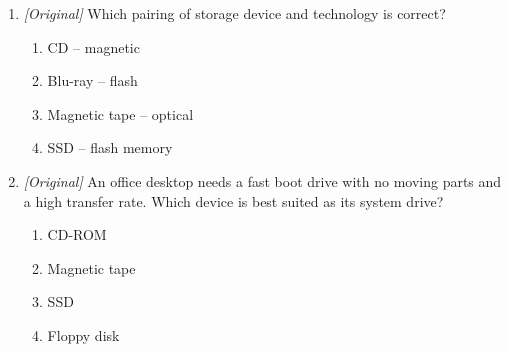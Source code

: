 \documentclass[11pt]{article}
\begin{document}
\begin{enumerate}[label=\textbf{Q\arabic*.}, leftmargin=*]
\begin{enumerate}[label=\Alph*.]
    \item Only in RAM
    \item With a laser
  \end{enumerate}
\item \textit{[Original]} Which pairing of storage device and technology is
  correct?
  \begin{enumerate}[label=\Alph*.]
    \item CD -- magnetic
    \item Blu-ray -- flash
    \item Magnetic tape -- optical
    \item SSD -- flash memory
  \end{enumerate}
\item \textit{[Original]} An office desktop needs a fast boot drive with no
  moving parts and a high transfer rate. Which device is best suited as its
  system drive?
  \begin{enumerate}[label=\Alph*.]
    \item CD-ROM
    \item Magnetic tape
    \item SSD
    \item Floppy disk
  \end{enumerate}


\end{enumerate}
\end{document}
